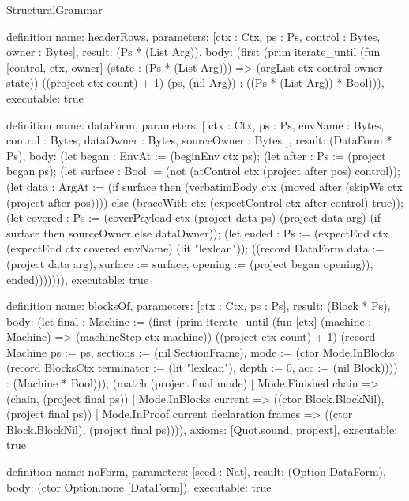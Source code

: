 \begin{lexlean}{StructuralGrammar}
\begin{semanticmodule}
{{definition{
  name: headerRows,
  parameters: [ctx : Ctx, ps : Ps, control : Bytes, owner : Bytes],
  result: (Ps * (List Arg)),
  body: (first (prim iterate_until (fun [control, ctx, owner] (state : (Ps * (List Arg))) => (argList ctx control owner state)) ((project ctx count) + 1) (ps, (nil Arg)) : ((Ps * (List Arg)) * Bool))),
  executable: true
}

definition{
  name: dataForm,
  parameters: [
    ctx : Ctx,
    ps : Ps,
    envName : Bytes,
    control : Bytes,
    dataOwner : Bytes,
    sourceOwner : Bytes
  ],
  result: (DataForm * Ps),
  body: (let began : EnvAt := (beginEnv ctx ps); (let after : Ps := (project began ps); (let surface : Bool := (not (atControl ctx (project after pos) control)); (let data : ArgAt := (if surface then (verbatimBody ctx (moved after (skipWs ctx (project after pos)))) else (braceWith ctx (expectControl ctx after control) true)); (let covered : Ps := (coverPayload ctx (project data ps) (project data arg) (if surface then sourceOwner else dataOwner)); (let ended : Ps := (expectEnd ctx (expectEnd ctx covered envName) (lit "lexlean")); ((record DataForm {data := (project data arg), surface := surface, opening := (project began opening)}), ended))))))),
  executable: true
}

definition{
  name: blocksOf,
  parameters: [ctx : Ctx, ps : Ps],
  result: (Block * Ps),
  body: (let final : Machine := (first (prim iterate_until (fun [ctx] (machine : Machine) => (machineStep ctx machine)) ((project ctx count) + 1) (record Machine {ps := ps, sections := (nil SectionFrame), mode := (ctor Mode.InBlocks (record BlocksCtx {terminator := (lit "lexlean"), depth := 0, acc := (nil Block)}))}) : (Machine * Bool))); (match (project final mode)
    | Mode.Finished chain => (chain, (project final ps))
    | Mode.InBlocks current => ((ctor Block.BlockNil), (project final ps))
    | Mode.InProof current declaration frames => ((ctor Block.BlockNil), (project final ps)))),
  axioms: [Quot.sound, propext],
  executable: true
}

definition{
  name: noForm,
  parameters: [seed : Nat],
  result: (Option DataForm),
  body: (ctor Option.none [DataForm]),
  executable: true
}

}}
\end{semanticmodule}
\end{lexlean}

